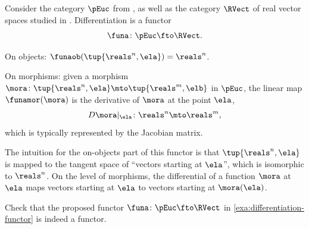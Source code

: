 \begin{example}[Differentiation]
    \label{exa:differentiation-functor}
    Consider the category $\pEuc$ from , as well as the category $\RVect$ of real vector spaces studied in .
    Differentiation is a functor
    \begin{equation}
        \funa \colon \pEuc \fto \RVect.
    \end{equation}

    On objects: $\funaob (\tup{\reals^n, \ela}) = \reals^n$.

    On morphisms: given a morphism $\mora \colon \tup{\reals^n, \ela} \mto \tup{\reals^m, \elb}$ in $\pEuc$, the linear map $\funamor(\mora)$ is the derivative of $\mora$ at the point $\ela$,
    \begin{equation}
        D \mora \vert_\ela \colon \reals^n \mto \reals^m,
    \end{equation}
    which is typically represented by the Jacobian matrix.

    The intuition for the on-objects part of this functor is that $\tup{\reals^n, \ela}$ is mapped to the tangent space of ``vectors starting at $\ela$'', which is isomorphic to $\reals^n$.
    On the level of morphisms, the differential of a function $\mora$ at $\ela$ maps vectors starting at $\ela$ to vectors starting at $\mora(\ela)$.
\end{example}

\begin{gradedexercise}
    \label{ex:DifferentiationFunctor}
    Check that the proposed functor $\funa \colon \pEuc \fto \RVect$ in \cref{exa:differentiation-functor} is indeed a functor.
\end{gradedexercise}

